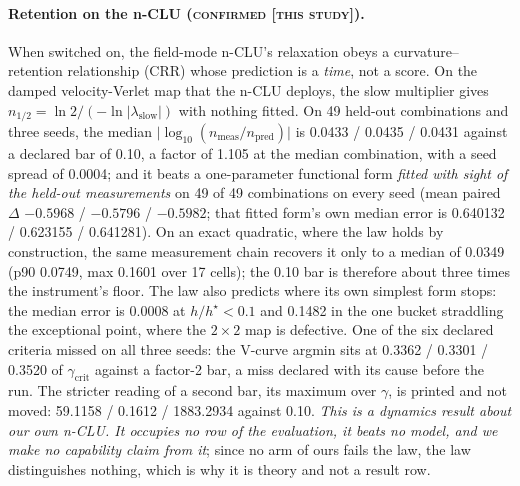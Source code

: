 \documentclass{article} %
\begin{document}
\paragraph{Retention on the n-CLU (\textsc{confirmed [this study]}).} When switched on, the field-mode
n-CLU's relaxation obeys a curvature--retention relationship (CRR) whose prediction is a
\emph{time}, not a score. On the damped velocity-Verlet map that the n-CLU deploys, the slow
multiplier gives $n_{1/2}=\ln2/(-\ln\lvert\lambda_{\text{slow}}\rvert)$ with nothing fitted. On 49
held-out combinations and three seeds, the median $\lvert\log_{10}(n_{\text{meas}}/n_{\text{pred}})\rvert$ is
0.0433 / 0.0435 / 0.0431 against a declared bar of 0.10, a factor of 1.105 at the median
combination, with a seed spread of 0.0004; and it beats a one-parameter functional form \emph{fitted with sight
of the held-out measurements} on 49 of 49 combinations on every seed (mean paired $\Delta$ $-0.5968$ /
$-0.5796$ / $-0.5982$; that fitted form's own median error is 0.640132 / 0.623155 / 0.641281).
On an exact quadratic, where the law holds by construction, the same measurement chain recovers it
only to a median of 0.0349 (p90 0.0749, max 0.1601 over 17 cells); the 0.10 bar is therefore about
three times the instrument's floor. %
The law also predicts where its own simplest form stops: the median error is 0.0008 at $h/h^\star<0.1$
and 0.1482 in the one bucket straddling the exceptional point, where the $2\times2$ map is
defective. %
One of the six declared criteria missed on all three seeds: the V-curve argmin sits at 0.3362 /
0.3301 / 0.3520 of $\gamma_{\text{crit}}$ against a factor-2 bar, a miss declared with its
cause before the run. The stricter reading of a second bar, its maximum over $\gamma$, is
printed and not moved: 59.1158 / 0.1612 / 1883.2934 against 0.10.
\emph{This is a dynamics result about our own n-CLU. It occupies no row of the evaluation, it
beats no model, and we make no capability claim from it}; since no arm of ours fails the law, the
law distinguishes nothing, which is why it is theory and not a result row.
\end{document}
